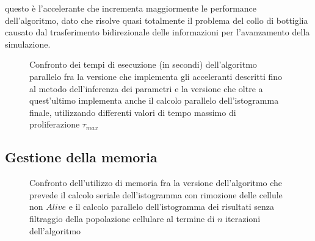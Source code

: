 questo è l'accelerante che incrementa maggiormente
le performance dell'algoritmo, dato che risolve quasi totalmente il problema
del collo di bottiglia causato dal trasferimento bidirezionale delle informazioni
per l'avanzamento della simulazione.
\begin{figure}[t]
    \centering
    \caption{Confronto dei tempi di esecuzione (in secondi) dell'algoritmo
    parallelo fra la versione che implementa gli acceleranti descritti fino al
    metodo dell'inferenza dei parametri
    e la versione che oltre a quest'ultimo implementa anche il calcolo parallelo
    dell'istogramma finale,
    utilizzando differenti valori di tempo massimo di proliferazione
    $\tau_{max}$}
    \label{chart:inference-histogram}
\end{figure}

\subsection{Gestione della memoria}

\begin{figure}[h]
    \centering
    \caption{Confronto dell'utilizzo di memoria fra la versione dell'algoritmo
        che prevede il calcolo seriale dell'istogramma con rimozione delle
        cellule non $Alive$ e il calcolo parallelo dell'istogramma dei risultati
        senza filtraggio della popolazione cellulare al termine di $n$ iterazioni
        dell'algoritmo}
    \label{chart:serial-parallel-histogram} 
\end{figure}

